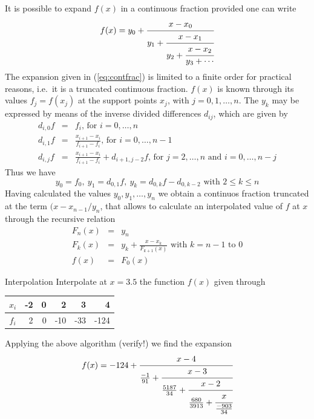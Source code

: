 It is possible to expand $f(x)$ in a continuous fraction provided one can write
\begin{equation}
	f(x)=y_0+\cfrac{x-x_0}{y_1+\cfrac{x-x_1}{y_2+\cfrac{x-x_2}{y_3+\cdots}}}
	\label{eq:contfrac}
\end{equation}
The expansion given in (\ref{eq:contfrac}) is limited to a finite order for
practical reasons, i.e.\ it is a truncated continuous fraction. $f(x)$ is known
through its values $f_j=f(x_j)$ at the support points $x_j$, with
$j=0,1,\dots,n$. The $y_k$ may be expressed by means of the inverse divided
differences $d_{ij}$, which are given by
\begin{eqnarray}
	d_{i,0}f&=&f_i\mbox{, for }i=0,\dots,n\nonumber\\
	d_{i,1}f&=&\frac{x_{i+1}-x_i}{f_{i+1}-f_i}\mbox{, for }i=0,\dots,n-1\label{eq:invdivdif}\\
	d_{i,j}f&=&\frac{x_{i+1}-x_i}{f_{i+1}-f_i}+d_{i+1,j-2}f\mbox{, for }j=2,\dots,n\mbox{ and }i=0,\dots,n-j\nonumber
\end{eqnarray}
Thus we have 
\[
y_0=f_0,\ y_1=d_{0,1}f,\ y_k=d_{0,k}f-d_{0,k-2}\mbox{ with }2\le k\le n
\]
Having calculated the values $y_0,y_1,\dots,y_n$ we obtain a continuos fraction
truncated at the term $(x-x_{n-1}/y_n$, that allows to calculate an
interpolated value of $f$ at $x$ through the recursive relation
\begin{eqnarray*}
	F_n(x)&=&y_n\\
	F_k(x)&=&y_k+\frac{x-x_k}{F_{k+1}(x)}\mbox{ with }k=n-1\mbox{ to }0\\
	f(x)&=&F_0(x)
\end{eqnarray*}

\begin{example}{Interpolation}
	\label{ex:contfrac}
Interpolate at $x=3.5$ the function $f(x)$ given through
\begin{center}
\begin{tabular}{c|rrrrr}
	$x_i$&-2&0&2&3&4\\\hline
	$f_i$&2&0&-10&-33&-124
\end{tabular}
\end{center}
Applying the above algorithm (verify!) we find the expansion
\begin{equation}
f(x)=-124+\cfrac{x-4}{\frac{-1}{91}+\cfrac{x-3}{\frac{5187}{34}+\cfrac{x-2}{\frac{680}{3913}+\cfrac{x}{\frac{-903}{34}}}}}
	\label{eq:excontfrac}
\end{equation}
\end{example}


